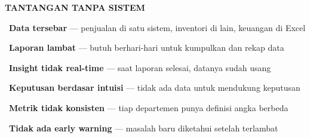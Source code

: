 \documentclass[a4paper]{article}
\begin{document}
\noindent
\begin{minipage}[t]{0.485\textwidth}
    \colorbox{RedLight}{%
        \begin{minipage}{\dimexpr\textwidth-2\fboxsep\relax}
            {\fontsize{10}{13}\selectfont\bfseries\color{RedText} TANTANGAN TANPA SISTEM}
        \end{minipage}}\par
    \vspace{4pt}

    {\fontsize{9.5}{13}\selectfont\color{TextDark}%
    \textbullet\ \textbf{Data tersebar} --- penjualan di satu sistem, inventori di lain, keuangan di Excel\par\vspace{4pt}%
    \textbullet\ \textbf{Laporan lambat} --- butuh berhari-hari untuk kumpulkan dan rekap data\par\vspace{4pt}%
    \textbullet\ \textbf{Insight tidak real-time} --- saat laporan selesai, datanya sudah usang\par\vspace{4pt}%
    \textbullet\ \textbf{Keputusan berdasar intuisi} --- tidak ada data untuk mendukung keputusan\par\vspace{4pt}%
    \textbullet\ \textbf{Metrik tidak konsisten} --- tiap departemen punya definisi angka berbeda\par\vspace{4pt}%
    \textbullet\ \textbf{Tidak ada early warning} --- masalah baru diketahui setelah terlambat}%
\end{minipage}%
\hfill%
\end{document}
